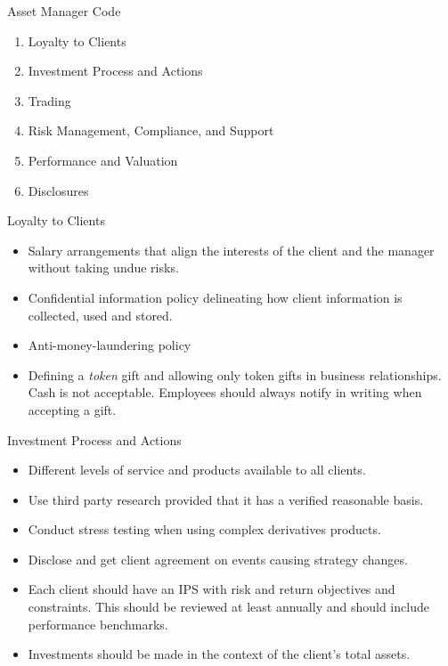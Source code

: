 \documentclass[../custom]{flashcards}
\begin{document}

\begin{flashcard}{Asset Manager Code}
    \begin{enumerate}
        \item Loyalty to Clients
        \item Investment Process and Actions
        \item Trading
        \item Risk Management, Compliance, and Support
        \item Performance and Valuation
        \item Disclosures
    \end{enumerate}
\end{flashcard}

\begin{flashcard}{Loyalty to Clients}
    \begin{itemize}
        \item Salary arrangements that align the interests of the client and the manager without taking undue risks.
        \item Confidential information policy delineating how client information is collected, used and stored.
        \item Anti-money-laundering policy
        \item Defining a \emph{token} gift and allowing only token gifts in business relationships. Cash is not acceptable. Employees should always notify in writing when accepting a gift.
    \end{itemize}
\end{flashcard}

\begin{flashcard}{Investment Process and Actions}
    \begin{itemize}
        \item Different levels of service and products available to all clients.
        \item Use third party research provided that it has a verified reasonable basis.
        \item Conduct stress testing when using complex derivatives products.
        \item Disclose and get client agreement on events causing strategy changes.
        \item Each client should have an IPS with risk and return objectives and constraints. This should be reviewed at least annually and should include performance benchmarks.
        \item Investments should be made in the context of the client's total assets.
    \end{itemize}
\end{flashcard}
\end{document}

